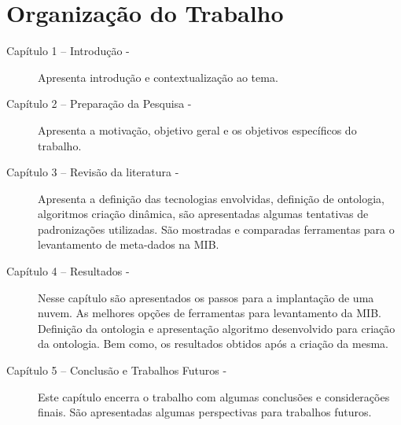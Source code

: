\section{Organização do Trabalho} 
\label{introducao:organizacao}

\begin{description}

\item[Capítulo 1 – Introdução -] Apresenta introdução e contextualização ao tema.  
\item[Capítulo 2 – Preparação da Pesquisa -] Apresenta a motivação, objetivo
geral e os objetivos específicos do trabalho.
\item[Capítulo 3 – Revisão da literatura -] Apresenta a definição das
tecnologias envolvidas, definição de ontologia, algoritmos criação dinâmica, são
apresentadas algumas tentativas de padronizações utilizadas. São mostradas e
comparadas ferramentas para o levantamento de meta-dados na MIB.
\item[Capítulo 4 – Resultados -] Nesse capítulo são apresentados os passos para
a implantação de uma nuvem. As melhores opções de ferramentas
para levantamento da MIB. Definição da ontologia e apresentação algoritmo
desenvolvido para criação da ontologia. Bem como, os resultados obtidos após a
criação da mesma.
\item[Capítulo 5 – Conclusão e Trabalhos Futuros -] Este capítulo encerra o
trabalho com algumas conclusões e considerações finais. São apresentadas algumas
perspectivas para trabalhos futuros.
\end{description}
